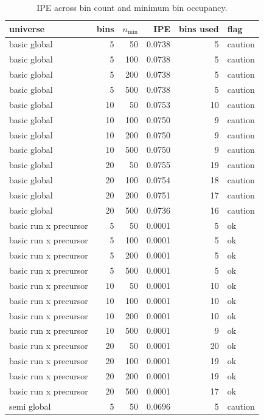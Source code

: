 \begin{table}[htbp]\centering
\caption{IPE across bin count and minimum bin occupancy.}
\label{tab:ipe_sens}\small
\begin{tabular}{lrrrrl}\toprule
universe & bins & $n_{\min}$ & IPE & bins used & flag \\ \midrule
basic global & 5 & 50 & 0.0738 & 5 & caution \\
basic global & 5 & 100 & 0.0738 & 5 & caution \\
basic global & 5 & 200 & 0.0738 & 5 & caution \\
basic global & 5 & 500 & 0.0738 & 5 & caution \\
basic global & 10 & 50 & 0.0753 & 10 & caution \\
basic global & 10 & 100 & 0.0750 & 9 & caution \\
basic global & 10 & 200 & 0.0750 & 9 & caution \\
basic global & 10 & 500 & 0.0750 & 9 & caution \\
basic global & 20 & 50 & 0.0755 & 19 & caution \\
basic global & 20 & 100 & 0.0754 & 18 & caution \\
basic global & 20 & 200 & 0.0751 & 17 & caution \\
basic global & 20 & 500 & 0.0736 & 16 & caution \\
basic run x precursor & 5 & 50 & 0.0001 & 5 & ok \\
basic run x precursor & 5 & 100 & 0.0001 & 5 & ok \\
basic run x precursor & 5 & 200 & 0.0001 & 5 & ok \\
basic run x precursor & 5 & 500 & 0.0001 & 5 & ok \\
basic run x precursor & 10 & 50 & 0.0001 & 10 & ok \\
basic run x precursor & 10 & 100 & 0.0001 & 10 & ok \\
basic run x precursor & 10 & 200 & 0.0001 & 10 & ok \\
basic run x precursor & 10 & 500 & 0.0001 & 9 & ok \\
basic run x precursor & 20 & 50 & 0.0001 & 20 & ok \\
basic run x precursor & 20 & 100 & 0.0001 & 19 & ok \\
basic run x precursor & 20 & 200 & 0.0001 & 19 & ok \\
basic run x precursor & 20 & 500 & 0.0001 & 17 & ok \\
semi global & 5 & 50 & 0.0696 & 5 & caution \\

\end{tabular}
\end{table}
